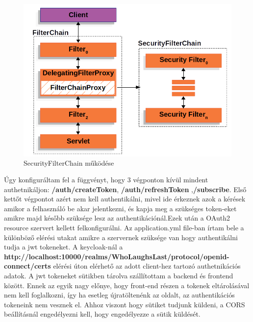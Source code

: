 \documentclass[a4paper,twoside]{article}
\begin{document}
\begin{figure}[h]
	\caption{SecurityFilterChain működése }
	\centering
	\includegraphics[scale=0.5]{filterchain}
\end{figure}

Úgy konfiguráltam fel a függvényt, hogy 3 végponton kívül mindent authetnikáljon: \textbf{/auth/createToken}, \textbf{/auth/refreshToken} ,\textbf{/subscribe}. Első kettőt végpontot azért nem kell authentikálni, mivel ide érkeznek azok a kérések amikor a felhasználó be akar jelentkezni, és kapja meg a szükséges token-eket amikre majd később szüksége lesz az authentikációnál.Ezek után a OAuth2 resource szervert kellett felkonfigurálni. Az application.yml file-ban írtam bele a különböző elérési utakat amikre a szervernek szüksége van hogy authentikálni tudja a jwt tokeneket. A keycloak-nál a \textbf{http://localhost:10000/realms/WhoLaughsLast/protocol/openid-connect/certs} elérési úton 
elérhető az adott client-hez tartozó authetnikációs adatok. A jwt tokeneket sütikben tárolva szállítottam a backend és frontend között. Ennek az egyik nagy előnye, hogy front-end részen a tokenek eltárolásával nem kell foglalkozni, így ha esetleg újratöltenénk az oldalt, az authentikációs tokeneink nem vesznek el. Ahhoz viszont hogy sütiket tudjunk küldeni, a CORS beállításnál engedélyezni kell, hogy engedélyezze a sütik küldését. 
\end{document}
